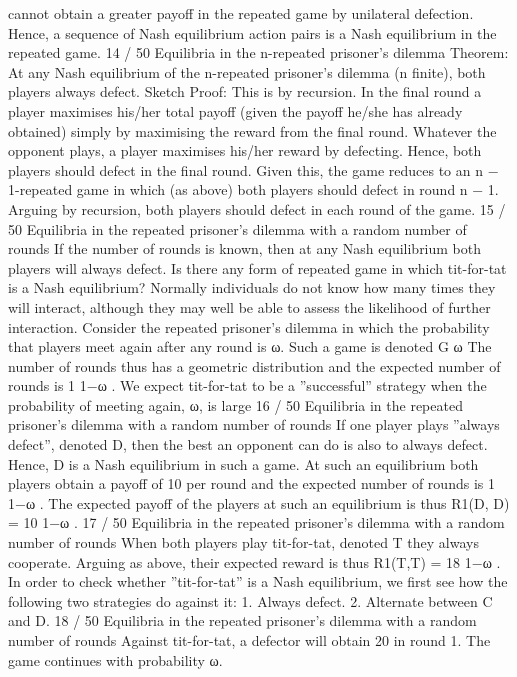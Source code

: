 cannot obtain a greater payoff in the repeated game by unilateral
defection. Hence, a sequence of Nash equilibrium action pairs is a
Nash equilibrium in the repeated game.
14 / 50
Equilibria in the n-repeated prisoner’s dilemma
Theorem: At any Nash equilibrium of the n-repeated prisoner’s
dilemma (n finite), both players always defect.
Sketch Proof: This is by recursion. In the final round a player
maximises his/her total payoff (given the payoff he/she has already
obtained) simply by maximising the reward from the final round.
Whatever the opponent plays, a player maximises his/her reward
by defecting. Hence, both players should defect in the final round.
Given this, the game reduces to an n − 1-repeated game in which
(as above) both players should defect in round n − 1. Arguing by
recursion, both players should defect in each round of the game.
15 / 50
Equilibria in the repeated prisoner’s dilemma with a
random number of rounds
If the number of rounds is known, then at any Nash equilibrium
both players will always defect. Is there any form of repeated game
in which tit-for-tat is a Nash equilibrium?
Normally individuals do not know how many times they will
interact, although they may well be able to assess the likelihood of
further interaction.
Consider the repeated prisoner’s dilemma in which the probability
that players meet again after any round is ω. Such a game is
denoted G
ω
The number of rounds thus has a geometric distribution and the
expected number of rounds is 1
1−ω
. We expect tit-for-tat to be a
”successful” strategy when the probability of meeting again, ω, is
large
16 / 50
Equilibria in the repeated prisoner’s dilemma with a
random number of rounds
If one player plays ”always defect”, denoted D, then the best an
opponent can do is also to always defect.
Hence, D is a Nash equilibrium in such a game.
At such an equilibrium both players obtain a payoff of 10 per round
and the expected number of rounds is 1
1−ω
.
The expected payoff of the players at such an equilibrium is thus
R1(D, D) = 10
1−ω
.
17 / 50
Equilibria in the repeated prisoner’s dilemma with a
random number of rounds
When both players play tit-for-tat, denoted T they always
cooperate.
Arguing as above, their expected reward is thus R1(T,T) = 18
1−ω
.
In order to check whether ”tit-for-tat” is a Nash equilibrium, we
first see how the following two strategies do against it:
1. Always defect.
2. Alternate between C and D.
18 / 50
Equilibria in the repeated prisoner’s dilemma with a
random number of rounds
Against tit-for-tat, a defector will obtain 20 in round 1. The game
continues with probability ω.
